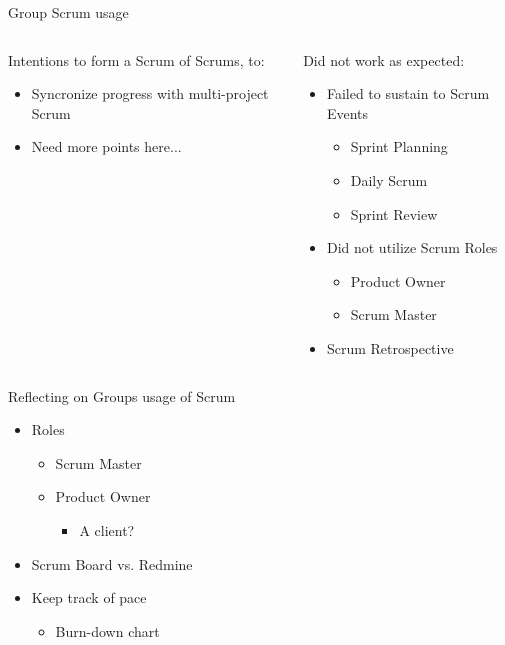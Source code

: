 \begin{frame}{Group Scrum usage}
  \begin{columns}
  		\begin{column}{0.5\textwidth}
  			Intentions to form a Scrum of Scrums, to:
  			\linespace
  			\begin{itemize}
  				\item Syncronize progress with multi-project Scrum
  				\item Need more points here...
  			\end{itemize}
  		\end{column}
  		\pause
  		\begin{column}{0.5\textwidth}
  			Did not work as expected:
  			\linespace
  			\begin{itemize}
  				\item Failed to sustain to Scrum Events
    				\begin{itemize}
    				\item Sprint Planning
    				\item Daily Scrum
    				\item Sprint Review
    				\end{itemize}
    		  \item Did not utilize Scrum Roles
      		  \begin{itemize}
      		  \item Product Owner
      		  \item Scrum Master
      		  \end{itemize}
      		\item Scrum Retrospective
  			\end{itemize}
  		\end{column}
  \end{columns}
\end{frame}

\begin{frame}{Reflecting on Groups usage of Scrum}
  
  \linespace
  \begin{itemize}
  \item Roles
    \begin{itemize}
    \item Scrum Master
    \item Product Owner
      \begin{itemize}
      \item A client?
      \end{itemize}
    \end{itemize}
  \item Scrum Board vs. Redmine
  \item Keep track of pace
    \begin{itemize}
    \item Burn-down chart
    \end{itemize}
  \end{itemize}
\end{frame}

